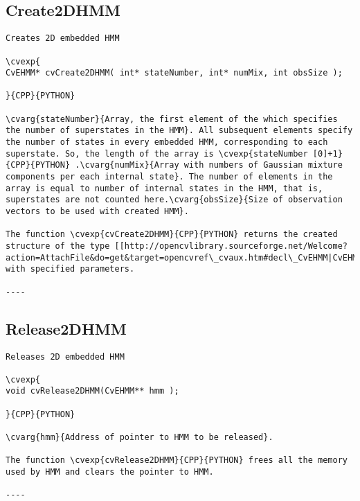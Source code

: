 \subsection{Create2DHMM}
\begin{verbatim}
Creates 2D embedded HMM

\cvexp{
CvEHMM* cvCreate2DHMM( int* stateNumber, int* numMix, int obsSize );

}{CPP}{PYTHON}

\cvarg{stateNumber}{Array, the first element of the which specifies the number of superstates in the HMM}. All subsequent elements specify the number of states in every embedded HMM, corresponding to each superstate. So, the length of the array is \cvexp{stateNumber [0]+1}{CPP}{PYTHON} .\cvarg{numMix}{Array with numbers of Gaussian mixture components per each internal state}. The number of elements in the array is equal to number of internal states in the HMM, that is, superstates are not counted here.\cvarg{obsSize}{Size of observation vectors to be used with created HMM}.

The function \cvexp{cvCreate2DHMM}{CPP}{PYTHON} returns the created structure of the type [[http://opencvlibrary.sourceforge.net/Welcome?action=AttachFile&do=get&target=opencvref\_cvaux.htm#decl\_CvEHMM|CvEHMM]] with specified parameters.

----
\end{verbatim}
\subsection{Release2DHMM}
\begin{verbatim}
Releases 2D embedded HMM

\cvexp{
void cvRelease2DHMM(CvEHMM** hmm );

}{CPP}{PYTHON}

\cvarg{hmm}{Address of pointer to HMM to be released}.

The function \cvexp{cvRelease2DHMM}{CPP}{PYTHON} frees all the memory used by HMM and clears the pointer to HMM.

----
\end{verbatim}
